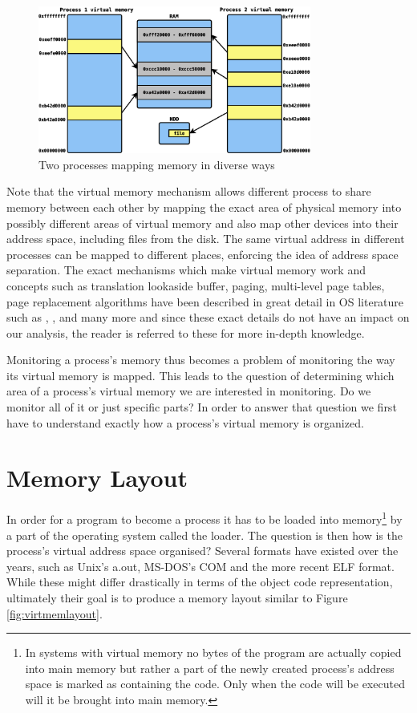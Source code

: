 \begin{figure}[htb]
\centering
\includegraphics[width=0.8\textwidth]{src/img/virtmem}
\caption{Two processes mapping memory in diverse ways}
\label{fig:virtmem}
\end{figure}

Note that the virtual memory mechanism allows different process to share memory between each other by mapping the exact area of physical memory into possibly different areas of virtual memory and also map other devices into their address space, including files from the disk. The same virtual address in different processes can be mapped to different places, enforcing the idea of address space separation. The exact mechanisms which make virtual memory work and concepts such as translation lookaside buffer, paging, multi-level page tables, page replacement algorithms have been described in great detail in OS literature such as \cite{Silberschatz08}, \cite{Tanenbaum07}, \cite{Drepper07} and many more and since these exact details do not have an impact on our analysis, the reader is referred to these for more in-depth knowledge.

Monitoring a process's memory thus becomes a problem of monitoring the way its virtual memory is mapped. This leads to the question of determining which area of a process's virtual memory we are interested in monitoring. Do we monitor all of it or just specific parts? In order to answer that question we first have to understand exactly how a process's virtual memory is organized.

\section{Memory Layout}
\label{section:memlayout}

In order for a program to become a process it has to be loaded into memory\footnote{In systems with virtual memory no bytes of the program are actually copied into main memory but rather a part of the newly created process's address space is marked as containing the code. Only when the code will be executed will it be brought into main memory.} by a part of the operating system called the loader. The question is then how is the process's virtual address space organised? Several formats have existed over the years, such as Unix's a.out, MS-DOS's COM and the more recent ELF format. While these might differ drastically in terms of the object code representation, ultimately their goal is to produce a memory layout similar to Figure \ref{fig:virtmemlayout}.

